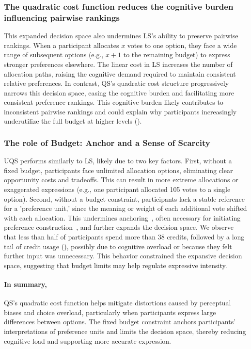 \subsubsection{The quadratic cost function reduces the cognitive burden influencing pairwise rankings}
This expanded decision space also undermines LS's ability to preserve pairwise rankings. When a participant allocates $x$ votes to one option, they face a wide range of subsequent options (e.g., $x+1$ to the remaining budget) to express stronger preferences elsewhere. The linear cost in LS increases the number of allocation paths, raising the cognitive demand required to maintain consistent relative preferences. In contrast, QS's quadratic cost structure progressively narrows this decision space, easing the cognitive burden and facilitating more consistent preference rankings. This cognitive burden likely contributes to inconsistent pairwise rankings and could explain why participants increasingly underutilize the full budget at higher levels (). %

\subsubsection{The role of Budget: Anchor and a Sense of Scarcity}
UQS performs similarly to LS, likely due to two key factors. First, without a fixed budget, participants face unlimited allocation options, eliminating clear opportunity costs and tradeoffs. This can result in more extreme allocations or exaggerated expressions (e.g., one participant allocated 105 votes to a single option). Second, without a budget constraint, participants lack a stable reference for a 'preference unit,' since the meaning or weight of each additional vote shifted with each allocation. This undermines anchoring~\cite{daniel2017thinking, tverskyJudgmentUncertaintyHeuristics1974}, often necessary for initiating preference construction~\cite{lichtensteinConstructionPreference2006}, and further expands the decision space. We observe that less than half of participants spend more than 38 credits, followed by a long tail of credit usage (), possibly due to cognitive overload or because they felt further input was unnecessary. This behavior constrained the expansive decision space, suggesting that budget limits may help regulate expressive intensity.

\paragraph{In summary,} QS's quadratic cost function helps mitigate distortions caused by perceptual biases and choice overload, particularly when participants express large differences between options. The fixed budget constraint anchors participants' interpretations of preference units and limits the decision space, thereby reducing cognitive load and supporting more accurate expression.

